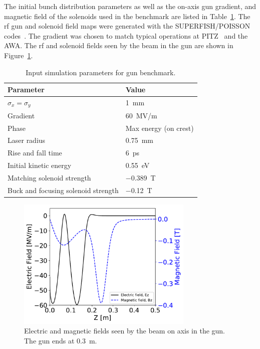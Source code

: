 The initial bunch distribution parameters as well as the 
on-axis gun gradient, and magnetic field of the solenoids used in 
the benchmark are listed in Table~\ref{tab:bench}. 
The rf gun and solenoid field maps were generated 
with the SUPERFISH/POISSON  codes~\cite{superfish}.
The gradient was chosen to match typical operations at PITZ~\cite{pitz}
and the AWA. The rf and solenoid fields seen by the beam in the gun are shown in Figure~\ref{fig:gunfields}.
\begin{table}
	\begin{center}
		\caption{Input simulation parameters for gun benchmark.}\label{tab:bench}
		\begin{tabular}{l l} 
	\toprule
	\toprule
	\textbf{Parameter} & \textbf{Value} \\ 
	\midrule
	$\sigma_x =\sigma_y$ & \SI{1}{mm} \\
	Gradient & \SI{60}{MV/m} \\
	
	Phase & Max energy (on crest) \\
	
	Laser radius & \SI{0.75}{mm} \\
	
	Rise and fall time & \SI{6}{ps} \\
	
	Initial kinetic energy & \SI{0.55}{eV} \\
	
	Matching solenoid strength & \SI{-0.389}{T} \\
	
	Buck and focusing solenoid strength & \SI{-0.12}{T} \\
	\bottomrule			
\end{tabular}
	\end{center}
\end{table}
\begin{figure}
	\begin{center}
		\includegraphics[width=0.75\textwidth]{images/gun_EM_fields}
		\caption{Electric and magnetic fields seen by the beam on axis in the gun. 
			The gun ends at \SI{0.3}{m}. }
		\label{fig:gunfields}
	\end{center}
\end{figure}

